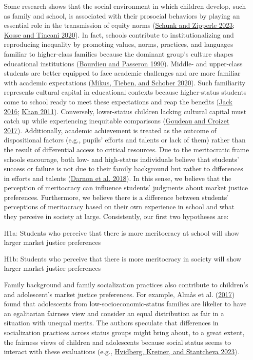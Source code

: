 \documentclass[
  letterpaper,
  DIV=11,
  numbers=noendperiod]{scrartcl}
\begin{document}
Some research shows that the social environment in which children
develop, such as family and school, is associated with their prosocial
behaviors by playing an essential role in the transmission of equity
norms (\protect\hyperlink{ref-schunk_fairness_2023}{Schunk and Zipperle
2023}; \protect\hyperlink{ref-kosse_prosociality_2020}{Kosse and Tincani
2020}). In fact, schools contribute to institutionalizing and
reproducing inequality by promoting values, norms, practices, and
languages familiar to higher-class families because the dominant group's
culture shapes educational institutions
(\protect\hyperlink{ref-bourdieu_reproduction_1990}{Bourdieu and
Passeron 1990}). Middle- and upper-class students are better equipped to
face academic challenges and are more familiar with academic
expectations (\protect\hyperlink{ref-mikus_children_2020}{Mikus, Tieben,
and Schober 2020}). Such familiarity represents cultural capital in
educational contexts because higher-status students come to school ready
to meet these expectations and reap the benefits
(\protect\hyperlink{ref-jack_no_2016}{Jack 2016};
\protect\hyperlink{ref-khan_privilege_2011}{Khan 2011}). Conversely,
lower-status children lacking cultural capital must catch up while
experiencing inequitable comparisons
(\protect\hyperlink{ref-goudeau_hidden_2017}{Goudeau and Croizet 2017}).
Additionally, academic achievement is treated as the outcome of
dispositional factors (e.g., pupils' efforts and talents or lack of
them) rather than the result of differential access to critical
resources. Due to the meritocratic frame schools encourage, both low-
and high-status individuals believe that students' success or failure is
not due to their family background but rather to differences in efforts
and talents (\protect\hyperlink{ref-darnon_where_2018}{Darnon et al.
2018}). In this sense, we believe that the perception of meritocracy can
influence students' judgments about market justice preferences.
Furthermore, we believe there is a difference between students'
perceptions of meritocracy based on their own experience in school and
what they perceive in society at large. Consistently, our first two
hypotheses are:

H1a: Students who perceive that there is more meritocracy at school will
show larger market justice preferences

H1b: Students who perceive that there is more meritocracy in society
will show larger market justice preferences

Family background and family socialization practices also contribute to
children's and adolescent's market justice preferences. For example,
Almås et al. (\protect\hyperlink{ref-almas_fairness_2017}{2017}) found
that adolescents from low-socioeconomic-status families are likelier to
have an egalitarian fairness view and consider an equal distribution as
fair in a situation with unequal merits. The authors speculate that
differences in socialization practices across status groups might bring
about, to a great extent, the fairness views of children and adolescents
because social status seems to interact with these evaluations (e.g.,
\protect\hyperlink{ref-hvidberg_social_2023}{Hvidberg, Kreiner, and
Stantcheva 2023}).~
\end{document}
